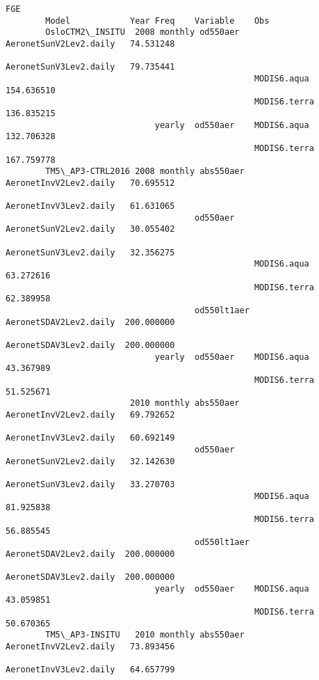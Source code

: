 \documentclass[11pt]{article}
\begin{document}
\begin{Verbatim}[commandchars=\\\{\}]
                                                                                 FGE  
        Model            Year Freq    Variable    Obs                                 
        OsloCTM2\_INSITU  2008 monthly od550aer    AeronetSunV2Lev2.daily   74.531248  
                                                  AeronetSunV3Lev2.daily   79.735441  
                                                  MODIS6.aqua             154.636510  
                                                  MODIS6.terra            136.835215  
                              yearly  od550aer    MODIS6.aqua             132.706328  
                                                  MODIS6.terra            167.759778  
        TM5\_AP3-CTRL2016 2008 monthly abs550aer   AeronetInvV2Lev2.daily   70.695512  
                                                  AeronetInvV3Lev2.daily   61.631065  
                                      od550aer    AeronetSunV2Lev2.daily   30.055402  
                                                  AeronetSunV3Lev2.daily   32.356275  
                                                  MODIS6.aqua              63.272616  
                                                  MODIS6.terra             62.389958  
                                      od550lt1aer AeronetSDAV2Lev2.daily  200.000000  
                                                  AeronetSDAV3Lev2.daily  200.000000  
                              yearly  od550aer    MODIS6.aqua              43.367989  
                                                  MODIS6.terra             51.525671  
                         2010 monthly abs550aer   AeronetInvV2Lev2.daily   69.792652  
                                                  AeronetInvV3Lev2.daily   60.692149  
                                      od550aer    AeronetSunV2Lev2.daily   32.142630  
                                                  AeronetSunV3Lev2.daily   33.270703  
                                                  MODIS6.aqua              81.925838  
                                                  MODIS6.terra             56.885545  
                                      od550lt1aer AeronetSDAV2Lev2.daily  200.000000  
                                                  AeronetSDAV3Lev2.daily  200.000000  
                              yearly  od550aer    MODIS6.aqua              43.059851  
                                                  MODIS6.terra             50.670365  
        TM5\_AP3-INSITU   2010 monthly abs550aer   AeronetInvV2Lev2.daily   73.893456  
                                                  AeronetInvV3Lev2.daily   64.657799  

\end{Verbatim}
\end{document}
